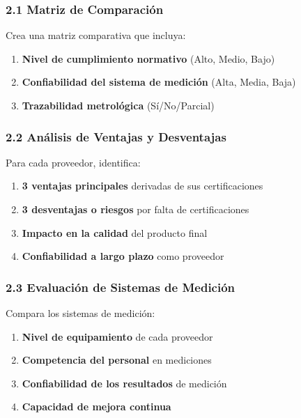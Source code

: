 \documentclass{article}
\begin{document}
\subsubsection*{2.1 Matriz de Comparación}

Crea una matriz comparativa que incluya:
\begin{enumerate}
    \item \textbf{Nivel de cumplimiento normativo} (Alto, Medio, Bajo)
    \item \textbf{Confiabilidad del sistema de medición} (Alta, Media, Baja)
    \item \textbf{Trazabilidad metrológica} (Sí/No/Parcial)
\end{enumerate}

\subsubsection*{2.2 Análisis de Ventajas y Desventajas}

Para cada proveedor, identifica:
\begin{enumerate}
    \item \textbf{3 ventajas principales} derivadas de sus certificaciones
    \item \textbf{3 desventajas o riesgos} por falta de certificaciones
    \item \textbf{Impacto en la calidad} del producto final
    \item \textbf{Confiabilidad a largo plazo} como proveedor
\end{enumerate}

\subsubsection*{2.3 Evaluación de Sistemas de Medición}

Compara los sistemas de medición:
\begin{enumerate}
    \item \textbf{Nivel de equipamiento} de cada proveedor
    \item \textbf{Competencia del personal} en mediciones
    \item \textbf{Confiabilidad de los resultados} de medición
    \item \textbf{Capacidad de mejora continua}
\end{enumerate}
\end{document}
